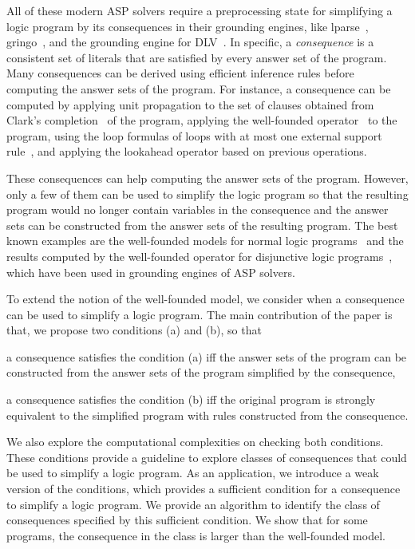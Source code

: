 \documentclass{article}
\newenvironment{tight_itemize}{
\begin{itemize}
   \setlength{\itemsep}{0pt}%
  \setlength{\topsep}{0pt}%
  \setlength{\partopsep}{0pt}%
  \setlength{\parskip}{0pt}%
  \setlength{\parsep}{0pt}%
}{\end{itemize}}
\begin{document}
All of these modern ASP solvers require a preprocessing state for simplifying a logic program by its consequences in their grounding engines, like lparse~\cite{syrjanen2000lparse}, gringo~\cite{gebser2007gringo}, and the grounding engine for DLV~\cite{leone2002dlv}. In specific, a {\em consequence} is a consistent set of literals that are satisfied by every answer set of the program. Many consequences can be derived using efficient inference rules before computing the answer sets of the program.
For instance, a consequence can be computed by applying unit propagation to the set of clauses obtained from Clark's completion~\cite{clark78} of the program, applying the well-founded operator~\cite{leone1997disjunctive} to the program, using the loop formulas of loops with at most one external support rule~\cite{chen2013}, and applying the lookahead operator based on previous operations.

These consequences can help computing the answer sets of the program.
However, only a few of them can be used to simplify the logic program so that the resulting program would no longer contain variables in the consequence and the answer sets can be constructed from the answer sets of the resulting program. The best known examples are the well-founded models for normal logic programs~\cite{van1991well} and the results computed by the well-founded operator for disjunctive logic programs~\cite{leone1997disjunctive}, which have been used in grounding engines of ASP solvers.


To extend the notion of the well-founded model, we consider when a consequence can be used to simplify a logic program.
The main contribution of the paper is that, we propose two conditions (a) and (b), so that
\begin{tight_itemize}
  \item a consequence satisfies the condition (a) if{f} the answer sets of the program can be constructed from the answer sets of the program simplified by the consequence,
  \item a consequence satisfies the condition (b) if{f} the original program is strongly equivalent to the simplified program with rules constructed from the consequence.
\end{tight_itemize}
We also explore the computational complexities on checking both conditions.
These conditions provide a guideline to explore classes of consequences that could be used to simplify a logic program.
As an application, we introduce a weak version of the conditions, which provides a sufficient condition for a consequence to simplify a logic program. We provide an algorithm to identify the class of consequences specified by this sufficient condition.
We show that for some programs, the consequence in the class is larger than the well-founded model.
\end{document}
